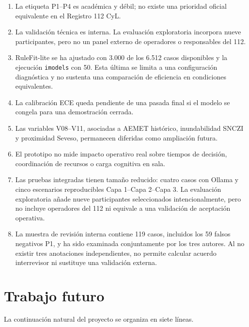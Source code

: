 \begin{enumerate}
    \item La etiqueta P1--P4 es académica y débil; no existe una prioridad oficial
    equivalente en el Registro 112 CyL.
    \item La validación técnica es interna. La evaluación exploratoria incorpora nueve
    participantes, pero no un panel externo de operadores o responsables del 112.
    \item RuleFit-lite se ha ajustado con 3.000 de los 6.512 casos disponibles y la
    ejecución \texttt{imodels} con 50. Esta última se limita a una configuración
    diagnóstica y no sustenta una comparación de eficiencia en condiciones equivalentes.
    \item La calibración ECE queda pendiente de una pasada final si el modelo se
    congela para una demostración cerrada.
    \item Las variables V08--V11, asociadas a AEMET histórico, inundabilidad SNCZI y
    proximidad Seveso, permanecen diferidas como ampliación futura.
    \item El prototipo no mide impacto operativo real sobre tiempos de decisión,
    coordinación de recursos o carga cognitiva en sala.
    \item Las pruebas integradas tienen tamaño reducido: cuatro casos con Ollama y
    cinco escenarios reproducibles Capa 1--Capa 2--Capa 3. La evaluación exploratoria
    añade nueve participantes seleccionados intencionalmente, pero no incluye operadores
    del 112 ni equivale a una validación de aceptación operativa.
    \item La muestra de revisión interna contiene 119 casos, incluidos los 59 falsos
    negativos P1, y ha sido examinada conjuntamente por los tres autores. Al no existir
    tres anotaciones independientes, no permite calcular acuerdo interrevisor ni sustituye
    una validación externa.
\end{enumerate}

\section{Trabajo futuro}

La continuación natural del proyecto se organiza en siete líneas.

